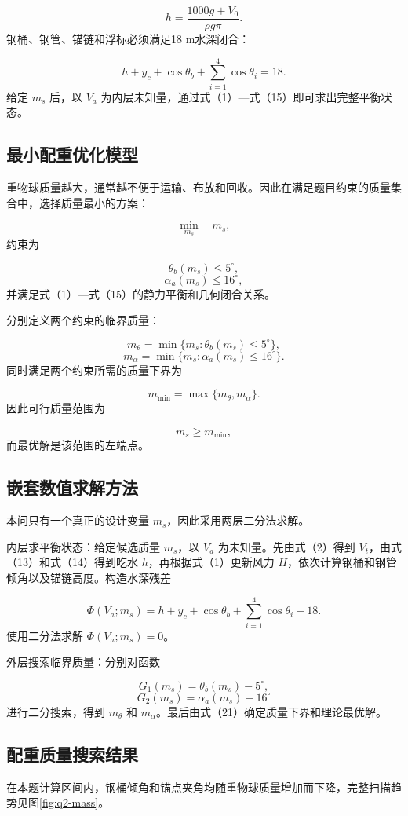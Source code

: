 \[
h=\frac{1000g+V_0}{\rho g\pi}. \tag{14}
\]
钢桶、钢管、锚链和浮标必须满足18 m水深闭合：

\[
h+y_c+\cos\theta_b+
\sum_{i=1}^{4}\cos\theta_i=18. \tag{15}
\]
给定 \(m_s\) 后，以 \(V_a\) 为内层未知量，通过式（1）—式（15）即可求出完整平衡状态。

\subsection{最小配重优化模型}
重物球质量越大，通常越不便于运输、布放和回收。因此在满足题目约束的质量集合中，选择质量最小的方案：

\[
\min_{m_s}\quad m_s, \tag{16}
\]
约束为

\[
\theta_b(m_s)\le5^\circ, \tag{17}
\]
\[
\alpha_a(m_s)\le16^\circ, \tag{18}
\]
并满足式（1）—式（15）的静力平衡和几何闭合关系。

分别定义两个约束的临界质量：

\[
m_\theta=\min\{m_s:\theta_b(m_s)\le5^\circ\}, \tag{19}
\]
\[
m_\alpha=\min\{m_s:\alpha_a(m_s)\le16^\circ\}. \tag{20}
\]
同时满足两个约束所需的质量下界为

\[
m_{\min}=\max\{m_\theta,m_\alpha\}. \tag{21}
\]
因此可行质量范围为

\[
m_s\ge m_{\min}, \tag{22}
\]
而最优解是该范围的左端点。

\subsection{嵌套数值求解方法}
本问只有一个真正的设计变量 \(m_s\)，因此采用两层二分法求解。

内层求平衡状态：给定候选质量 \(m_s\)，以 \(V_a\) 为未知量。先由式（2）得到 \(V_t\)，由式（13）和式（14）得到吃水 \(h\)，再根据式（1）更新风力 \(H\)，依次计算钢桶和钢管倾角以及锚链高度。构造水深残差

\[
\Phi(V_a;m_s)=h+y_c+\cos\theta_b+
\sum_{i=1}^{4}\cos\theta_i-18. \tag{23}
\]
使用二分法求解 \(\Phi(V_a;m_s)=0\)。

外层搜索临界质量：分别对函数

\[
G_1(m_s)=\theta_b(m_s)-5^\circ,
\]
\[
G_2(m_s)=\alpha_a(m_s)-16^\circ
\]
进行二分搜索，得到 \(m_\theta\) 和 \(m_\alpha\)。最后由式（21）确定质量下界和理论最优解。

\subsection{配重质量搜索结果}
在本题计算区间内，钢桶倾角和锚点夹角均随重物球质量增加而下降，完整扫描趋势见图\ref{fig:q2-mass}。

